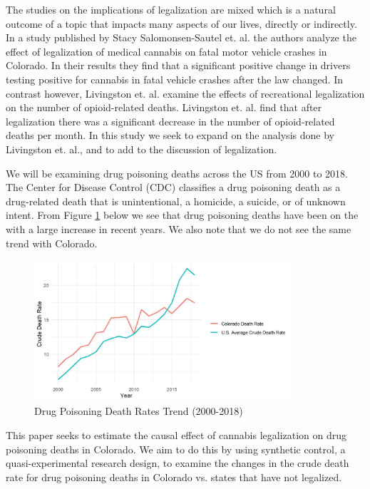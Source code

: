 \documentclass{article}
\begin{document}


The studies on the implications of legalization are mixed which is a natural outcome of a topic that impacts many aspects of our lives, directly or indirectly. In a study published by Stacy Salomonsen-Sautel et. al. the authors analyze the effect of legalization of medical cannabis on fatal motor vehicle crashes in Colorado. In their results they find that a significant positive change in drivers testing positive for cannabis in fatal vehicle crashes after the law changed. In contrast however, Livingston et. al. examine the effects of recreational legalization on the number of opioid-related deaths. Livingston et. al. find that after legalization there was a significant decrease in the number of opioid-related deaths per month. In this study we seek to expand on the analysis done by Livingston et. al., and to add to the discussion of legalization.

We will be examining drug poisoning deaths across the US from 2000 to 2018. The Center for Disease Control (CDC) classifies a drug poisoning death as a drug-related death that is unintentional, a homicide, a suicide, or of unknown intent. From Figure \ref{fig:death_rates_trend} below we see that drug poisoning deaths have been on the with a large increase in recent years. We also note that we do not see the same trend with Colorado.

\begin{figure}[H]
	\begin{center}
		\includegraphics[width=0.85\textwidth]{death_rates_trend}
	\end{center}
	\caption{Drug Poisoning Death Rates Trend (2000-2018)}
	\label{fig:death_rates_trend}
\end{figure}

This paper seeks to estimate the causal effect of cannabis legalization on drug poisoning deaths in Colorado. We aim to do this by using synthetic control, a quasi-experimental research design, to examine the changes in the crude death rate for drug poisoning deaths in Colorado vs. states that have not legalized. 
\end{document}
